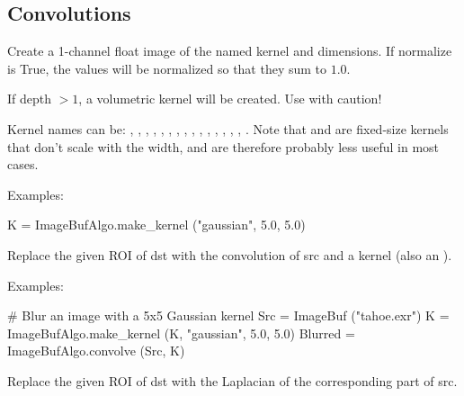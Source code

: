\subsection{Convolutions}
\label{sec:iba:py:convolutions}

 
Create a 1-channel {\cf float} image of the named kernel
and dimensions.  If {\cf normalize} is {\cf True}, the values will be
normalized so that they sum to $1.0$.

If {\cf depth} $> 1$, a volumetric kernel will be created.  Use with
caution!

Kernel names can be: , , ,
, , , ,
, , , , ,
, , , . Note that
 and  are fixed-size kernels that don't
scale with the width, and are therefore probably less useful in most
cases.

\smallskip
\noindent Examples:
\begin{code}
    K = ImageBufAlgo.make_kernel ("gaussian", 5.0, 5.0)
\end{code}
\apiend


 
Replace the given ROI of {\cf dst} with the convolution of {\cf src} and
a kernel (also an \ImageBuf).

\smallskip
\noindent Examples:
\begin{code}
    # Blur an image with a 5x5 Gaussian kernel
    Src = ImageBuf ("tahoe.exr")
    K = ImageBufAlgo.make_kernel (K, "gaussian", 5.0, 5.0)
    Blurred = ImageBufAlgo.convolve (Src, K)
\end{code}
\apiend


 
Replace the given ROI of {\cf dst} with the Laplacian of the corresponding
part of {\cf src}.

